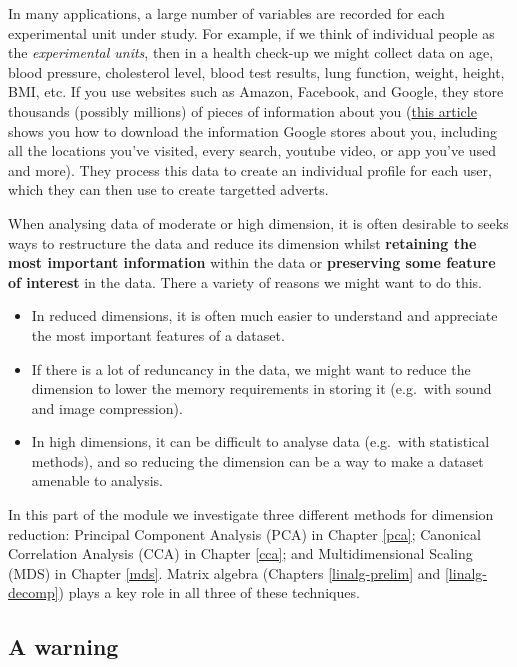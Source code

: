 \documentclass[]{book}
\providecommand{\tightlist}{%
  \setlength{\itemsep}{0pt}\setlength{\parskip}{0pt}}
\theoremstyle{definition}
\theoremstyle{definition}
\theoremstyle{definition}
\theoremstyle{remark}
\begin{document}
In many applications, a large number of variables are recorded for each experimental unit under study. For example, if we think of individual people as the \emph{experimental units}, then in a health check-up we might collect data on age, blood pressure, cholesterol level, blood test results, lung function, weight, height, BMI, etc. If you use websites such as Amazon, Facebook, and Google, they store thousands (possibly millions) of pieces of information about you (\href{https://www.theguardian.com/commentisfree/2018/mar/28/all-the-data-facebook-google-has-on-you-privacy}{this article} shows you how to download the information Google stores about you, including all the locations you've visited, every search, youtube video, or app you've used and more). They process this data to create an individual profile for each user, which they can then use to create targetted adverts.

When analysing data of moderate or high dimension, it is often desirable to seeks ways to restructure the data and reduce its dimension whilst \textbf{retaining the most important information} within the data or \textbf{preserving some feature of interest} in the data. There a variety of reasons we might want to do this.

\begin{itemize}
\tightlist
\item
  In reduced dimensions, it is often much easier to understand and appreciate the most important features of a dataset.
\item
  If there is a lot of reduncancy in the data, we might want to reduce the dimension to lower the memory requirements in storing it (e.g.~with sound and image compression).
\item
  In high dimensions, it can be difficult to analyse data (e.g.~with statistical methods), and so reducing the dimension can be a way to make a dataset amenable to analysis.
\end{itemize}

In this part of the module we investigate three different methods for dimension reduction: Principal Component Analysis (PCA) in Chapter \ref{pca}; Canonical Correlation Analysis (CCA) in Chapter \ref{cca}; and Multidimensional Scaling (MDS) in Chapter \ref{mds}. Matrix algebra (Chapters \ref{linalg-prelim} and \ref{linalg-decomp}) plays a key role in all three of these techniques.

\hypertarget{a-warning}{%
\subsection*{A warning}\label{a-warning}}
\end{document}
